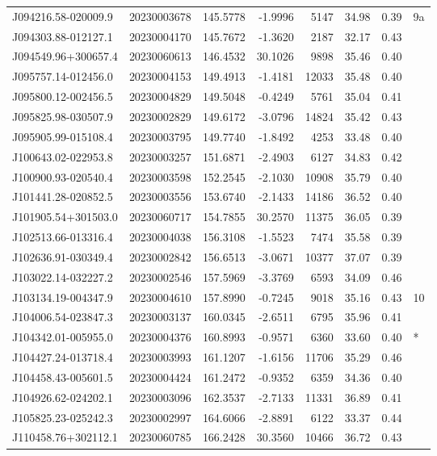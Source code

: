 \documentclass{article}
\begin{document}
\begin {longtable}{|l|l|r|r|r|r|r|l|}
 J094216.58-020009.9&  20230003678&  145.5778&   -1.9996&  5147& 34.98& 0.39&9a\\%
 J094303.88-012127.1&  20230004170&  145.7672&   -1.3620&  2187& 32.17& 0.43&\\
 J094549.96+300657.4&  20230060613&  146.4532&   30.1026&  9898& 35.46& 0.40&\\
 J095757.14-012456.0&  20230004153&  149.4913&   -1.4181& 12033& 35.48& 0.40&\\
 J095800.12-002456.5&  20230004829&  149.5048&   -0.4249&  5761& 35.04& 0.41&\\
 J095825.98-030507.9&  20230002829&  149.6172&   -3.0796& 14824& 35.42& 0.43&\\
 J095905.99-015108.4&  20230003795&  149.7740&   -1.8492&  4253& 33.48& 0.40&\\
 J100643.02-022953.8&  20230003257&  151.6871&   -2.4903&  6127& 34.83& 0.42&\\
 J100900.93-020540.4&  20230003598&  152.2545&   -2.1030& 10908& 35.79& 0.40&\\
 J101441.28-020852.5&  20230003556&  153.6740&   -2.1433& 14186& 36.52& 0.40&\\
 J101905.54+301503.0&  20230060717&  154.7855&   30.2570& 11375& 36.05& 0.39&\\
 J102513.66-013316.4&  20230004038&  156.3108&   -1.5523&  7474& 35.58& 0.39&\\
 J102636.91-030349.4&  20230002842&  156.6513&   -3.0671& 10377& 37.07& 0.39&\\
 J103022.14-032227.2&  20230002546&  157.5969&   -3.3769&  6593& 34.09& 0.46&\\
 J103134.19-004347.9&  20230004610&  157.8990&   -0.7245&  9018& 35.16& 0.43&10\\%
 J104006.54-023847.3&  20230003137&  160.0345&   -2.6511&  6795& 35.96& 0.41&\\
 J104342.01-005955.0&  20230004376&  160.8993&   -0.9571&  6360& 33.60& 0.40&*\\
 J104427.24-013718.4&  20230003993&  161.1207&   -1.6156& 11706& 35.29& 0.46&\\
 J104458.43-005601.5&  20230004424&  161.2472&   -0.9352&  6359& 34.36& 0.40&\\
 J104926.62-024202.1&  20230003096&  162.3537&   -2.7133& 11331& 36.89& 0.41&\\
 J105825.23-025242.3&  20230002997&  164.6066&   -2.8891&  6122& 33.37& 0.44&\\
 J110458.76+302112.1&  20230060785&  166.2428&   30.3560& 10466& 36.72& 0.43&\\

\end{longtable}
\end{document}
